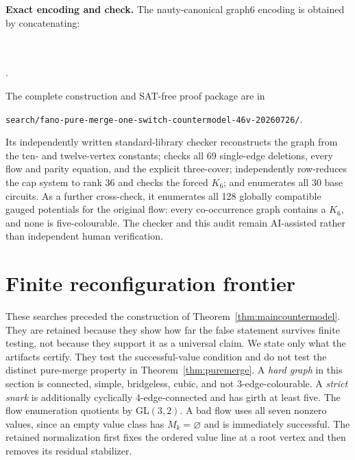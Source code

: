 \documentclass[11pt]{article}
\theoremstyle{definition}
\theoremstyle{remark}
\begin{document}
\medskip
\noindent
\textbf{Exact encoding and check.}
The nauty-canonical graph6 encoding is obtained by concatenating:
\begin{center}
\small
\texttt{}\\
\texttt{}\\
\texttt{}.
\end{center}
The complete construction and SAT-free proof package are in
\begin{center}
\texttt{search/fano-pure-merge-one-switch-countermodel-46v-20260726/}.
\end{center}
Its independently written standard-library checker reconstructs the
graph from the ten- and twelve-vertex constants; checks all 69
single-edge deletions, every flow and parity equation, and the explicit
three-cover; independently row-reduces the cap system to rank 36 and
checks the forced \(K_6\); and enumerates all 30 base circuits.  As a
further cross-check, it enumerates all 128 globally compatible gauged
potentials for the original flow: every co-occurrence graph contains a
\(K_6\), and none is five-colourable.  The checker and this audit remain
AI-assisted rather than independent human verification.

\section{Finite reconfiguration frontier}
\label{sec:computation}

These searches preceded the construction of
Theorem~\ref{thm:maincountermodel}.  They are retained because they show
how far the false statement survives finite testing, not because they
support it as a universal claim.  We state only what the artifacts
certify.  They test the successful-value condition and do not test the
distinct pure-merge property in Theorem~\ref{thm:puremerge}.  A \emph{hard
graph} in this section is connected, simple, bridgeless, cubic, and not
3-edge-colourable.  A \emph{strict snark} is additionally cyclically
4-edge-connected and has girth at least five.  The flow enumeration quotients by
\(\mathrm{GL}(3,2)\).  A bad flow uses all seven nonzero values, since an
empty value class has \(M_k=\varnothing\) and is immediately successful.
The retained normalization first fixes the ordered value line at a root
vertex and then removes its residual stabilizer.
\end{document}
